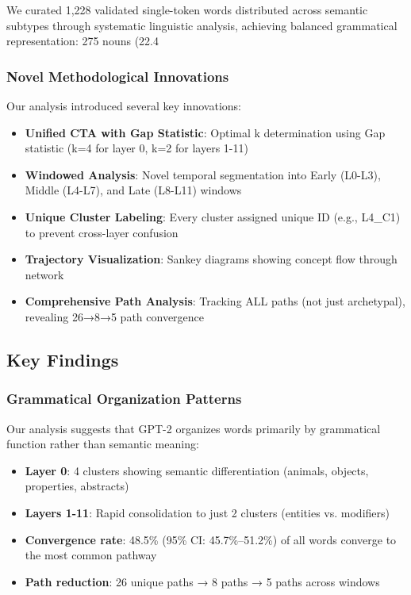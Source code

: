 We curated 1,228 validated single-token words distributed across semantic subtypes through systematic linguistic analysis, achieving balanced grammatical representation: 275 nouns (22.4%

\subsubsection{Novel Methodological Innovations}

Our analysis introduced several key innovations:

\begin{itemize}
    \item \textbf{Unified CTA with Gap Statistic}: Optimal k determination using Gap statistic (k=4 for layer 0, k=2 for layers 1-11)
    \item \textbf{Windowed Analysis}: Novel temporal segmentation into Early (L0-L3), Middle (L4-L7), and Late (L8-L11) windows
    \item \textbf{Unique Cluster Labeling}: Every cluster assigned unique ID (e.g., L4\_C1) to prevent cross-layer confusion
    \item \textbf{Trajectory Visualization}: Sankey diagrams showing concept flow through network
    \item \textbf{Comprehensive Path Analysis}: Tracking ALL paths (not just archetypal), revealing 26→8→5 path convergence
\end{itemize}

\subsection{Key Findings}

\subsubsection{Grammatical Organization Patterns}

Our analysis suggests that GPT-2 organizes words primarily by grammatical function rather than semantic meaning:

\begin{itemize}
    \item \textbf{Layer 0}: 4 clusters showing semantic differentiation (animals, objects, properties, abstracts)
    \item \textbf{Layers 1-11}: Rapid consolidation to just 2 clusters (entities vs. modifiers)
    \item \textbf{Convergence rate}: 48.5\% (95\% CI: 45.7\%–51.2\%) of all words converge to the most common pathway
    \item \textbf{Path reduction}: 26 unique paths → 8 paths → 5 paths across windows
\end{itemize}

